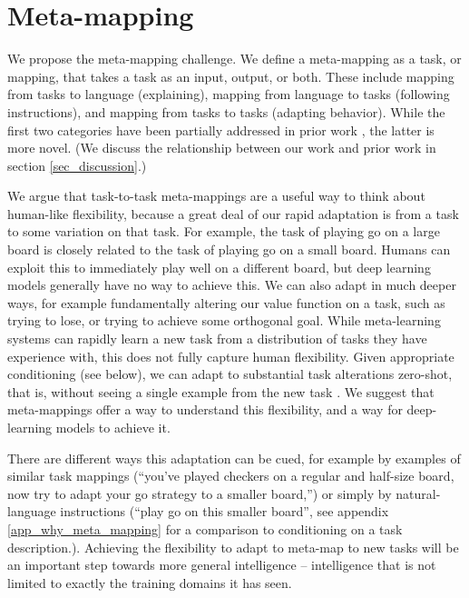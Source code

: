 \documentclass{article}
\begin{document}
\section{Meta-mapping}
\vspace{-0.5em} %
We propose the meta-mapping challenge. We define a meta-mapping as a task, or mapping, that takes a task as an input, output, or both. These include mapping from tasks to language (explaining), mapping from language to tasks (following instructions), and mapping from tasks to tasks (adapting behavior). While the first two categories have been partially addressed in prior work \citep[e.g.][]{Hermann2017, Co-Reyes2019}, the latter is more novel. (We discuss the relationship between our work and prior work in section \ref{sec_discussion}.) \par
We argue that task-to-task meta-mappings are a useful way to think about human-like flexibility, because a great deal of our rapid adaptation is from a task to some variation on that task. For example, the task of playing go on a large board is closely related to the task of playing go on a small board. Humans can exploit this to immediately play well on a different board, but deep learning models generally have no way to achieve this. We can also adapt in much deeper ways, for example fundamentally altering our value function on a task, such as trying to lose, or trying to achieve some orthogonal goal. While meta-learning systems can rapidly learn a new task from a distribution of tasks they have experience with, this does not fully capture human flexibility. Given appropriate conditioning (see below), we can adapt to substantial task alterations zero-shot, that is, without seeing a single example from the new task \citep{Lake2016}. We suggest that meta-mappings offer a way to understand this flexibility, and a way for deep-learning models to achieve it.\par
There are different ways this adaptation can be cued, for example by examples of similar task mappings (``you've played checkers on a regular and half-size board, now try to adapt your go strategy to a smaller board,'') or simply by natural-language instructions (``play go on this smaller board'', see appendix \ref{app_why_meta_mapping} for a comparison to conditioning on a task description.). Achieving the flexibility to adapt to meta-map to new tasks will be an important step towards more general intelligence -- intelligence that is not limited to exactly the training domains it has seen. \par 
\end{document}
